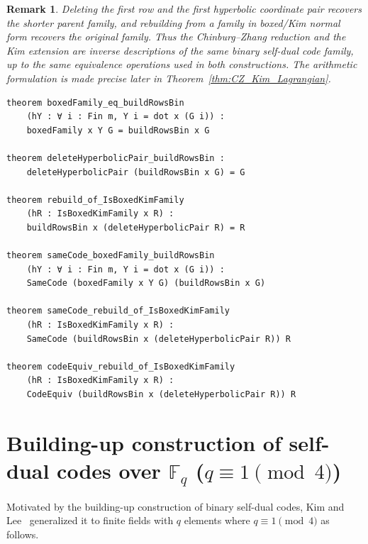 \documentclass[12pt]{article}
\newtheorem{remark}[theorem]{Remark}
\begin{document}
\begin{remark}{\rm
Deleting the first row and the first hyperbolic coordinate pair recovers the shorter parent family, and rebuilding from a family in boxed/Kim normal form recovers the original family. Thus the Chinburg--Zhang reduction and the Kim extension are inverse descriptions of the same binary self-dual code family, up to the same equivalence operations used in both constructions. The arithmetic formulation is made precise later in Theorem~\ref{thm:CZ_Kim_Lagrangian}.
}
\end{remark}

\begin{lstlisting}[caption={Lean bundle for Theorem~\ref{thm:binary-cz-kim}.}]
theorem boxedFamily_eq_buildRowsBin
    (hY : ∀ i : Fin m, Y i = dot x (G i)) :
    boxedFamily x Y G = buildRowsBin x G

theorem deleteHyperbolicPair_buildRowsBin :
    deleteHyperbolicPair (buildRowsBin x G) = G

theorem rebuild_of_IsBoxedKimFamily
    (hR : IsBoxedKimFamily x R) :
    buildRowsBin x (deleteHyperbolicPair R) = R

theorem sameCode_boxedFamily_buildRowsBin
    (hY : ∀ i : Fin m, Y i = dot x (G i)) :
    SameCode (boxedFamily x Y G) (buildRowsBin x G)

theorem sameCode_rebuild_of_IsBoxedKimFamily
    (hR : IsBoxedKimFamily x R) :
    SameCode (buildRowsBin x (deleteHyperbolicPair R)) R

theorem codeEquiv_rebuild_of_IsBoxedKimFamily
    (hR : IsBoxedKimFamily x R) :
    CodeEquiv (buildRowsBin x (deleteHyperbolicPair R)) R
\end{lstlisting}

\section{Building-up construction of self-dual codes over $\mathbb F_q$ ($q \equiv 1 \pmod{4}$)}

Motivated by the building-up construction of binary self-dual codes, Kim and Lee~\cite{LeeKim} generalized it to finite fields with $q$ elements where $q \equiv 1 \pmod{4}$ as follows.
\end{document}
